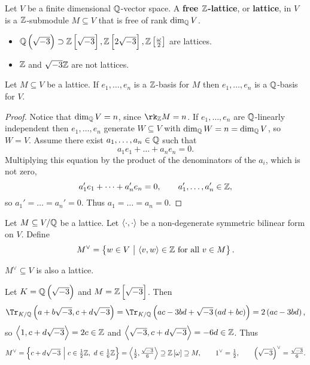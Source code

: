 
\begin{definition}
Let $ V $ be a finite dimensional $ \mathbb{Q} $-vector space. A \textbf{free $ \mathbb{Z} $-lattice}, or \textbf{lattice}, in $ V $ is a $ \mathbb{Z} $-submodule $ M \subseteq V $ that is free of rank $ \dim_{\mathbb{Q}} V $.
\end{definition}

\begin{example*}
\hfill
\begin{itemize}
\item $ \QQ\br{\sqrt{-3}} \supset \ZZ\sbr{\sqrt{-3}}, \ZZ\sbr{2\sqrt{-3}}, \ZZ\sbr{\tfrac{\omega}{2}} $ are lattices.
\item $ \mathbb{Z} $ and $ \sqrt{-3}\mathbb{Z} $ are not lattices.
\end{itemize}
\end{example*}

\begin{lemma}
Let $ M \subseteq V $ be a lattice. If $ e_1, \dots, e_n $ is a $ \mathbb{Z} $-basis for $ M $ then $ e_1, \dots, e_n $ is a $ \mathbb{Q} $-basis for $ V $.
\end{lemma}

\begin{proof}
Notice that $ \dim_{\mathbb{Q}} V = n $, since $ \rk_\ZZ M = n $. If $ e_1, \dots, e_n $ are $ \mathbb{Q} $-linearly independent then $ e_1, \dots, e_n $ generate $ W \subseteq V $ with $ \dim_{\mathbb{Q}} W = n = \dim_{\mathbb{Q}} V $, so $ W = V $. Assume there exist $ a_1, \dots, a_n \in \mathbb{Q} $ such that
$$ a_1e_1 + \dots + a_ne_n = 0. $$
Multiplying this equation by the product of the denominators of the $ a_i $, which is not zero,
$$ a_1'e_1 + \dots + a_n'e_n = 0, \qquad a_1', \dots, a_n' \in \mathbb{Z}, $$
so $ a_1' = \dots = a_n' = 0 $. Thus $ a_1 = \dots = a_n = 0 $.
\end{proof}

Let $ M \subseteq V / \mathbb{Q} $ be a lattice. Let $ \left\langle \cdot, \cdot \right\rangle $ be a non-degenerate symmetric bilinear form on $ V $. Define
$$ M^\vee = \cbr{w \in V \st \abr{v, w} \in \ZZ \ \text{for all} \ v \in M}. $$

\begin{proposition}
\label{prop:duallattice}
$ M^\vee \subseteq V $ is also a lattice.
\end{proposition}

\begin{example*}
Let $ K = \QQ\br{\sqrt{-3}} $ and $ M = \ZZ\sbr{\sqrt{-3}} $. Then
$$ \Tr_{K / \QQ}\br{a + b\sqrt{-3}, c + d\sqrt{-3}} = \Tr_{K / \QQ} \br{ac - 3bd + \sqrt{-3}\br{ad + bc}} = 2\br{ac - 3bd}, $$
so $ \left\langle 1, c + d\sqrt{-3} \right\rangle = 2c \in \mathbb{Z} $ and $ \left\langle \sqrt{-3}, c + d\sqrt{-3} \right\rangle = -6d \in \mathbb{Z} $. Thus
$$ M^\vee = \cbr{c + d\sqrt{-3} \st c \in \tfrac{1}{2}\ZZ, \ d \in \tfrac{1}{6}\ZZ} = \abr{\tfrac{1}{2}, \tfrac{\sqrt{-3}}{6}} \supseteq \ZZ\sbr{\omega} \supseteq M, \qquad 1^\vee = \tfrac{1}{2}, \qquad \br{\sqrt{-3}}^\vee = \tfrac{\sqrt{-3}}{6}. $$
\end{example*}

